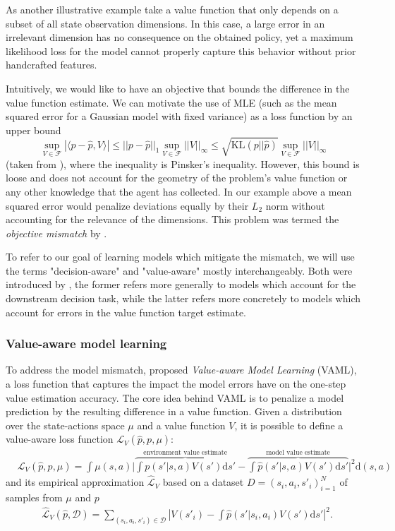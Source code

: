 As another illustrative example take a value function that only depends on a subset of all state observation dimensions. 
In this case, a large error in an irrelevant dimension has no consequence on the obtained policy, yet a maximum likelihood loss for the model cannot properly capture this behavior without prior handcrafted features.

Intuitively, we would like to have an objective that bounds the difference in the value function estimate.
We can motivate the use of MLE (such as the mean squared error for a Gaussian model with fixed variance) as a loss function {by an upper bound}
$$\sup_{V \in \mathcal{F}}|\langle p - \hat{p}, V\rangle|\leq ||p - \hat{p}||_1 \sup_{V \in \mathcal{F}}||V||_\infty \leq \sqrt{\text{KL}(p||\hat{p})}\sup_{V \in \mathcal{F}}||V||_\infty$$ 
(taken from
\textcite{vaml}), where the inequality is Pinsker's inequality.
However, this bound is loose and does not account for the geometry of the problem's value function or any other knowledge that the agent has collected. 
In our example above a mean squared error would penalize deviations equally by their $L_2$ norm without accounting for the relevance of the dimensions.
This problem was termed the \emph{objective mismatch} by \parencite{lambert202objective}.

To refer to our goal of learning models which mitigate the mismatch, we will use the terms "decision-aware" and "value-aware" mostly interchangeably.
Both were introduced by \textcite{vaml}, the former refers more generally to models which account for the downstream decision task, while the latter refers more concretely to models which account for errors in the value function target estimate.

\subsubsection{Value-aware model learning}

To address the model mismatch, \parencite{vaml} proposed \emph{Value-aware Model Learning} (VAML), a loss function that captures the impact the model errors have on the one-step value estimation accuracy.
The core idea behind VAML is to penalize a model prediction by the resulting difference in a value function. Given a distribution over the state-actions space $\mu$ and a value function $V$, it is possible to define a value-aware loss function $\mathcal{L}_V(\hat{p}, p, \mu)$:
\begin{align}
    &\mathcal{L}_V(\hat{p}, p, \mu) = \int \mu(s,a) \bigg|\overbrace{\int p(s'|s,a)V(s')\mathrm{d}s'}^{\text{environment value estimate}}  - \overbrace{\int \hat{p}(s'|s,a) V(s') \mathrm{d}s'}^{\text{model value estimate}}\bigg|^2 \mathrm{d} (s,a)
    \end{align}
    and its empirical approximation $\hat{\mathcal{L}}_V$ based on a dataset $D = (s_i,a_i,s'_i)_{i=1}^N$ of samples from $\mu$ and $p$
    \begin{align}
    &\hat{\mathcal{L}}_V(\hat{p}, \mathcal{D}) = \sum_{(s_i,a_i,s'_i)\in\mathcal{D}} \left|V(s'_i) - \int \hat{p}(s'|s_i,a_i) V(s') \mathrm{d} s'\right|^2\label{IterVAMLloss}.
\end{align}

